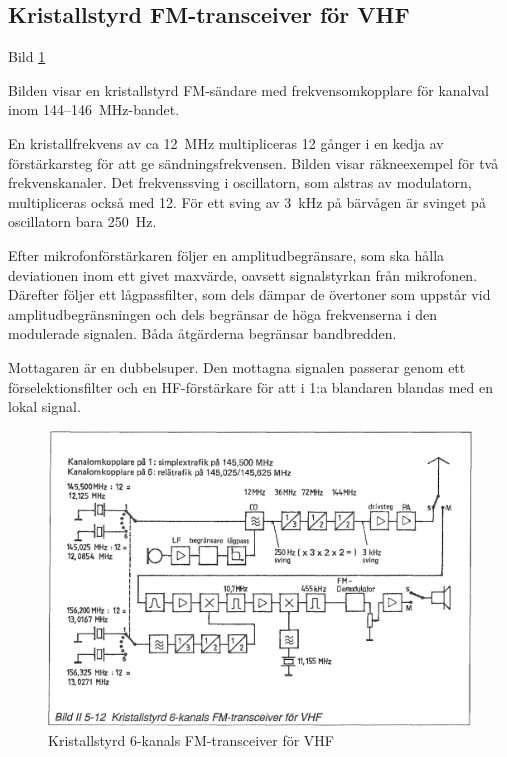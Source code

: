 \subsection{Kristallstyrd FM-transceiver för VHF}

Bild \ref{fig:bildII5-12}

Bilden visar en kristallstyrd FM-sändare med frekvensomkopplare för
kanalval inom 144--146~MHz-bandet.

En kristallfrekvens av ca 12~MHz multipliceras 12 gånger i en kedja
av förstärkarsteg för att ge sändningsfrekvensen. Bilden visar
räkneexempel för två frekvenskanaler. Det frekvenssving i oscillatorn,
som alstras av modulatorn, multipliceras också med 12.  För ett sving
av 3~kHz på bärvågen är svinget på oscillatorn bara 250~Hz.

Efter mikrofonförstärkaren följer en amplitudbegränsare, som ska
hålla deviationen inom ett givet maxvärde, oavsett signalstyrkan från
mikrofonen. Därefter följer ett lågpassfilter, som dels dämpar de
övertoner som uppstår vid amplitudbegränsningen och dels begränsar de
höga frekvenserna i den modulerade signalen. Båda åtgärderna begränsar
bandbredden.

Mottagaren är en dubbelsuper. Den mottagna signalen passerar genom ett
förselektionsfilter och en HF-förstärkare för att i 1:a blandaren
blandas med en lokal signal.

\begin{figure}
  \includegraphics[width=\textwidth]{images/bild_2_5-12}
  \caption{Kristallstyrd 6-kanals FM-transceiver för VHF}
  \label{fig:bildII5-12}
\end{figure}

